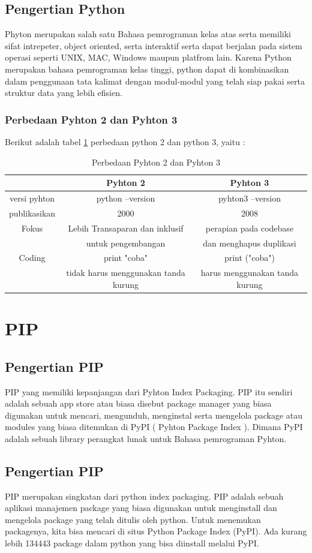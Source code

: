 \documentclass[12pt,a4paper]{article}
\begin{document}
\subsection{Pengertian Python}
Phyton merupakan salah satu Bahasa pemrograman kelas atas serta memiliki sifat intrepeter, object oriented, serta interaktif serta dapat berjalan pada sistem operasi seperti UNIX, MAC, Windows maupun platfrom lain. Karena Python merupakan bahasa pemrograman kelas tinggi, python dapat di kombinasikan dalam penggunaan tata kalimat dengan modul-modul yang telah siap pakai serta struktur data yang lebih efisien.
\subsubsection{Perbedaan Pyhton 2 dan Pyhton 3}
Berikut adalah tabel \ref{table:perbedaan} perbedaan python 2 dan python 3, yaitu :
\begin{table}[h]
\caption{Perbedaan Pyhton 2 dan Pyhton 3}
\centering
\begin{tabular}{ccc}
\hline
 &Pyhton 2&Pyhton 3\\
\hline
versi pyhton&python --version&pyhton3 --version\\
publikasikan&2000&2008\\
Fokus&Lebih Transaparan dan inklusif &perapian pada codebase\\
&untuk pengembangan&dan menghapus duplikasi\\
Coding&print "coba"  &print ("coba")\\
&tidak harus menggunakan tanda kurung& harus menggunakan tanda kurung\\
\end{tabular}
\label{table:perbedaan}
\end{table}

\section{PIP}
\subsection{Pengertian PIP}
PIP yang memiliki kepanjangan dari Pyhton Index Packaging. PIP itu sendiri adalah sebuah app store atau biasa disebut package manager yang biasa digunakan untuk mencari, mengunduh, menginstal serta mengelola package atau modules yang biasa ditemukan di PyPI ( Pyhton Package Index ). Dimana PyPI adalah sebuah library perangkat lunak untuk Bahasa pemrograman Pyhton.
\subsection{Pengertian PIP}
PIP merupakan singkatan dari python index packaging. PIP adalah sebuah aplikasi manajemen package yang biasa digunakan untuk menginstall dan mengelola package yang telah ditulis oleh python. Untuk menemukan packagenya, kita bisa mencari di situs Python Package Index (PyPI). Ada kurang lebih 134443 package dalam python yang bisa diinstall melalui PyPI.
\end{document}
